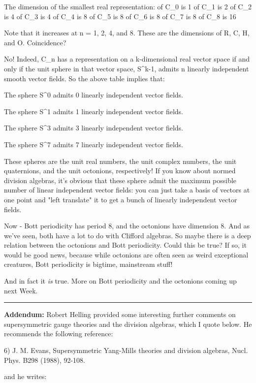 The dimension of the smallest real representation:
of C_{0} is 1
of C_{1} is  2
of C_{2} is  4
of C_{3} is  4
of C_{4} is  8
of C_{5} is  8
of C_{6} is 8
of C_{7} is  8
of C_{8} is  16

Note that it increases at n = 1, 2, 4, and 8.  These are the dimensions
of R, C, H, and O.  Coincidence?  

No!  Indeed, C_{n} has a representation on a k-dimensional real
vector space if and only if the unit sphere in that vector space,
S^{k-1}, admits n linearly independent smooth vector fields.  So the
above table implies that:

The sphere S^{0} admits 0 linearly independent vector fields.  

The sphere S^{1} admits 1 linearly independent vector fields.  

The sphere S^{3} admits 3 linearly independent vector fields.  

The sphere S^{7} admits 7 linearly independent vector fields.  

These spheres are the unit real numbers, the unit complex numbers, the
unit quaternions, and the unit octonions, respectively!  If you know
about normed division algebras, it's obvious that these sphere admit the
maximum possible number of linear independent vector fields: you can
just take a basis of vectors at one point and "left translate" it to get
a bunch of linearly independent vector fields.  

Now - Bott periodicity has period 8, and the octonions have dimension
8.  And as we've seen, both have a lot to do with Clifford algebras.  So
maybe there is a deep relation between the octonions and Bott
periodicity.  Could this be true?  If so, it would be good news, because
while octonions are often seen as weird exceptional creatures, Bott
periodicity is bigtime, mainstream stuff!

And in fact it \emph{is} true.  More on Bott periodicity and the octonions
coming up next Week.

\par\noindent\rule{\textwidth}{0.4pt}
\textbf{Addendum:}  Robert Helling provided some interesting further comments
on supersymmetric gauge theories and the division algebras, which 
I quote below.  He recommends the following reference:

6) J. M. Evans, Supersymmetric Yang-Mills theories and division algebras, Nucl.
Phys. B298 (1988), 92-108.

and he writes:


